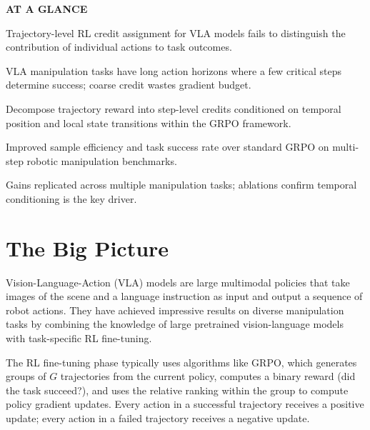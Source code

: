\documentclass[10pt,twocolumn]{article}
\begin{document}
\begin{mdframed}[backgroundcolor=boxgray,linecolor=rulered,linewidth=1pt,
    innerleftmargin=6pt,innerrightmargin=6pt,
    innertopmargin=6pt,innerbottommargin=6pt]
\textbf{\small AT A GLANCE}\par\vspace{4pt}
\begin{description}[leftmargin=0pt,labelsep=4pt,itemsep=2pt,parsep=0pt,
    font=\small\bfseries]
  \item[Problem:] Trajectory-level RL credit assignment for VLA models fails to
    distinguish the contribution of individual actions to task outcomes.
  \item[Why it matters:] VLA manipulation tasks have long action horizons where
    a few critical steps determine success; coarse credit wastes gradient budget.
  \item[Method:] Decompose trajectory reward into step-level credits conditioned
    on temporal position and local state transitions within the GRPO framework.
  \item[Result:] Improved sample efficiency and task success rate over standard
    GRPO on multi-step robotic manipulation benchmarks.
  \item[Evidence:] Gains replicated across multiple manipulation tasks; ablations
    confirm temporal conditioning is the key driver.
\end{description}
\end{mdframed}

\section{The Big Picture}

Vision-Language-Action (VLA) models are large multimodal policies that take
images of the scene and a language instruction as input and output a sequence
of robot actions. They have achieved impressive results on diverse manipulation
tasks by combining the knowledge of large pretrained vision-language models
with task-specific RL fine-tuning.

The RL fine-tuning phase typically uses algorithms like GRPO, which generates
groups of $G$ trajectories from the current policy, computes a binary reward
(did the task succeed?), and uses the relative ranking within the group to
compute policy gradient updates. Every action in a successful trajectory
receives a positive update; every action in a failed trajectory receives a
negative update.
\end{document}
